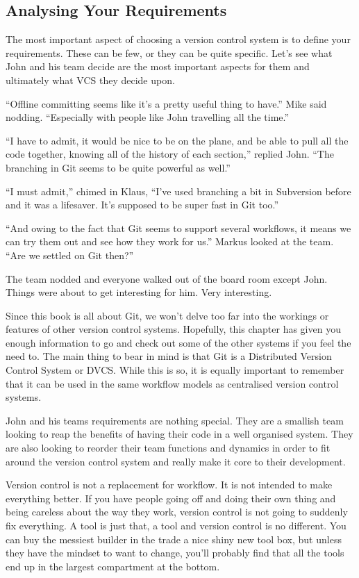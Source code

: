 \subsection{Analysing Your Requirements}
The most important aspect of choosing a version control system is to define your requirements.
These can be few, or they can be quite specific. Let's see what John and his team decide are the most important aspects for them and ultimately what VCS they decide upon.

\begin{trenches}
``Offline committing seems like it's a pretty useful thing to have.'' Mike said nodding.
``Especially with people like John travelling all the time.''

``I have to admit, it would be nice to be on the plane, and be able to pull all the code together, knowing all of the history of each section,'' replied John.
``The branching in Git seems to be quite powerful as well.''

``I must admit,'' chimed in Klaus, ``I've used branching a bit in Subversion before and it was a lifesaver.
It's supposed to be super fast in Git too.''

``And owing to the fact that Git seems to support several workflows, it means we can try them out and see how they work for us.'' Markus looked at the team.
``Are we settled on Git then?''

The team nodded and everyone walked out of the board room except John.
Things were about to get interesting for him.
Very interesting.
\end{trenches}

Since this book is all about Git, we won't delve too far into the workings or features of other version control systems.
Hopefully, this chapter has given you enough information to go and check out some of the other systems if you feel the need to.
The main thing to bear in mind is that Git is a Distributed Version Control System or DVCS.
While this is so, it is equally important to remember that it can be used in the same workflow models as centralised version control systems.

John and his teams requirements are nothing special.
They are a smallish team looking to reap the benefits of having their code in a well organised system.
They are also looking to reorder their team functions and dynamics in order to fit around the version control system and really make it core to their development.

Version control is not a replacement for workflow.
It is not intended to make everything better.
If you have people going off and doing their own thing and being careless about the way they work, version control is not going to suddenly fix everything.
A tool is just that, a tool and version control is no different.
You can buy the messiest builder in the trade a nice shiny new tool box, but unless they have the mindset to want to change, you'll probably find that all the tools end up in the largest compartment at the bottom.

